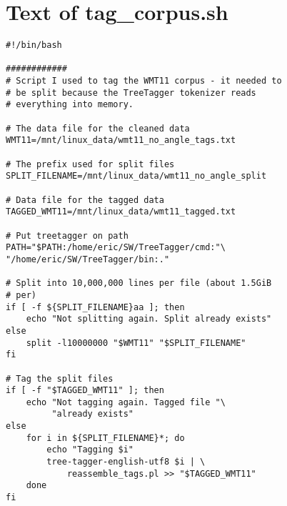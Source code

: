 \documentclass[eric_thesis.tex]{subfiles}
\begin{document}
\section{Text of tag\_corpus.sh}
\label{app:tagcorpus}
\lstset{language=sh}
\begin{lstlisting}
#!/bin/bash

############
# Script I used to tag the WMT11 corpus - it needed to
# be split because the TreeTagger tokenizer reads
# everything into memory.

# The data file for the cleaned data
WMT11=/mnt/linux_data/wmt11_no_angle_tags.txt

# The prefix used for split files
SPLIT_FILENAME=/mnt/linux_data/wmt11_no_angle_split

# Data file for the tagged data
TAGGED_WMT11=/mnt/linux_data/wmt11_tagged.txt

# Put treetagger on path
PATH="$PATH:/home/eric/SW/TreeTagger/cmd:"\
"/home/eric/SW/TreeTagger/bin:."

# Split into 10,000,000 lines per file (about 1.5GiB
# per)
if [ -f ${SPLIT_FILENAME}aa ]; then 
    echo "Not splitting again. Split already exists"
else
    split -l10000000 "$WMT11" "$SPLIT_FILENAME"
fi

# Tag the split files
if [ -f "$TAGGED_WMT11" ]; then 
    echo "Not tagging again. Tagged file "\
         "already exists"
else
    for i in ${SPLIT_FILENAME}*; do
        echo "Tagging $i"
        tree-tagger-english-utf8 $i | \
            reassemble_tags.pl >> "$TAGGED_WMT11"
    done
fi
\end{lstlisting}
\end{document}
